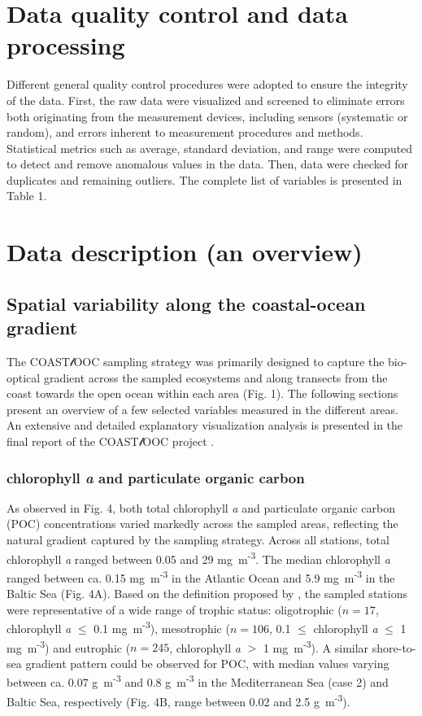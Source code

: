 \documentclass[essd, manuscript]{copernicus}
\begin{document}
\section{Data quality control and data processing}

Different general quality control procedures were adopted to ensure the integrity of the data. First, the raw data were visualized and screened to eliminate errors both originating from the measurement devices, including sensors (systematic or random), and errors inherent to measurement procedures and methods. Statistical metrics such as average, standard deviation, and range were computed to detect and remove anomalous values in the data. Then, data were checked for duplicates and remaining outliers. The complete list of variables is presented in Table 1.

\section{Data description (an overview)}

\subsection{Spatial variability along the coastal-ocean gradient}

The COAST$\mathscr{l}$OOC sampling strategy was primarily designed to capture the bio-optical gradient across the sampled ecosystems and along transects from the coast towards the open ocean within each area (Fig. 1). The following sections present an overview of a few selected variables measured in the different areas. An extensive and detailed explanatory visualization analysis is presented in the final report of the COAST$\mathscr{l}$OOC project \citep{Coastlooc2000}.

\subsubsection{chlorophyll \textit{a} and particulate organic carbon}

As observed in Fig. 4, both total chlorophyll \textit{a} and particulate organic carbon (POC) concentrations varied markedly across the sampled areas, reflecting the natural gradient captured by the sampling strategy. Across all stations, total chlorophyll \textit{a} ranged between 0.05 and 29 mg~m\textsuperscript{-3}. The median chlorophyll \textit{a} ranged between ca. 0.15 mg~m\textsuperscript{-3} in the Atlantic Ocean and 5.9 mg~m\textsuperscript{-3} in the Baltic Sea (Fig. 4A). Based on the definition proposed by \citealt{Antoine1996}, the sampled stations were representative of a wide range of trophic status: oligotrophic ($n = 17$, chlorophyll \textit{a} $\le$ 0.1 mg~m\textsuperscript{-3}), mesotrophic ($n = 106$, 0.1 $\le$ chlorophyll \textit{a} $\le$ 1 mg~m\textsuperscript{-3}) and eutrophic ($n = 245$, chlorophyll \textit{a} $>$ 1 mg~m\textsuperscript{-3}). A similar shore-to-sea gradient pattern could be observed for POC, with median values varying between ca. 0.07 g~m\textsuperscript{-3} and 0.8 g~m\textsuperscript{-3} in the Mediterranean Sea (case 2) and Baltic Sea, respectively (Fig. 4B, range between 0.02 and 2.5 g~m\textsuperscript{-3}).
\end{document}
